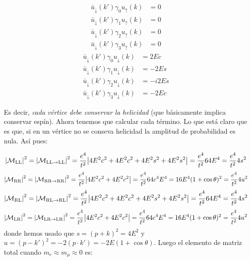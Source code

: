 \begin{minipage}[t]{0.48\textwidth}
\begin{align*}
    \bar{u}_\downarrow (k') \gamma_0 {u}_\uparrow (k) & = 0 \\
    \bar{u}_\downarrow (k') \gamma_1 {u}_\uparrow (k) & = 0 \\
    \bar{u}_\downarrow (k') \gamma_2 {u}_\uparrow (k) & = 0 \\
    \bar{u}_\downarrow (k') \gamma_3 {u}_\uparrow (k) & = 0
\end{align*}
\begin{align*}
    \bar{u}_\downarrow(k') \gamma_0 {u}_\downarrow (k) & = 2Ec \\
    \bar{u}_\downarrow(k') \gamma_1 {u}_\downarrow (k) & = -2Es \\
    \bar{u}_\downarrow(k') \gamma_2 {u}_\downarrow (k) & = -i2Es \\
    \bar{u}_\downarrow(k') \gamma_3 {u}_\downarrow (k) & = -2Ec
\end{align*}
\end{minipage}
Es decir, \textit{cada vértice debe conservar la helicidad} (que básicamente implica conservar espín). Ahora tenemos que calcular cada término. Lo que está claro que es que, si en un vértice no se conseva helicidad la amplitud de probabilidad es nula. Así pues: 

\begin{equation}
    \vqty{\Mcal_{\text{LL}}}^2 = \vqty{\Mcal_{\text{LL}\to\text{LL}}}^2 = \frac{e^4}{t^2}\vqty{4E^2c^2+4E^2c^2+4E^2s^2+4E^2s^2} = \frac{e^4}{t^2}  64 E^4 = \frac{e^4}{t^2}  4s^2
\end{equation}
\begin{equation}
    \vqty{\Mcal_{\text{RR}}}^2 = \vqty{\Mcal_{\text{RR}\to\text{RR}}}^2 = \frac{e^4}{t^2}\vqty{4E^2c^2+4E^2c^2} = \frac{e^4}{t^2}  64 c^4 E^4 = 16 E^4 (1+\cos \theta)^2 =  \frac{e^4}{t^2} 4 u^2
\end{equation}
\begin{equation}
    \vqty{\Mcal_{\text{RL}}}^2 = \vqty{\Mcal_{\text{RL}\to\text{RL}}}^2 = \frac{e^4}{t^2}\vqty{4E^2c^2+4E^2c^2+4E^2s^2+4E^2s^2} = \frac{e^4}{t^2}  64 E^4 = \frac{e^4}{t^2}  4s^2
\end{equation}
\begin{equation}
    \vqty{\Mcal_{\text{LR}}}^2 = \vqty{\Mcal_{\text{LR}\to\text{LR}}}^2 = \frac{e^4}{t^2}\vqty{4E^2c^2+4E^2c^2} = \frac{e^4}{t^2}  64 c^4 E^4 = 16 E^4 (1+\cos \theta)^2 =  \frac{e^4}{t^2} 4 u^2
\end{equation}
donde hemos usado que $s=(p+k)^2=4E^2$ y $u=(p-k')^2=-2(p\cdot k')=-2E(1+\cos \theta)$. Luego el elemento de matriz total cuando $m_e \approx m_\mu \approx 0$ es: 

